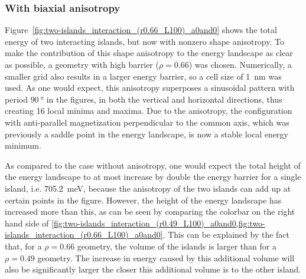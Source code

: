 \documentclass[11pt,a4paper,english]{article}
\begin{document}
\subsubsection{With biaxial anisotropy}
Figure~\ref{fig:two-islands_interaction_(r0.66_L100)_a0and0} shows the total energy of two interacting islands, but now with nonzero shape anisotropy. To make the contribution of this shape anisotropy to the energy landscape as clear as possible, a geometry with high barrier ($\rho=0.66$) was chosen. Numerically, a smaller grid also results in a larger energy barrier, so a cell size of \SI{1}{\nano\metre} was used. As one would expect, this anisotropy superposes a sinusoidal pattern with period $\SI{90}{\degree}$ in the figures, in both the vertical and horizontal directions, thus creating 16 local minima and maxima. Due to the anisotropy, the configuration with anti-parallel magnetization perpendicular to the common axis, which was previously a saddle point in the energy landscape, is now a stable local energy minimum. \par
As compared to the case without anisotropy, one would expect the total height of the energy landscape to at most increase by double the energy barrier for a single island, i.e. \SI{705.2}{\milli\electronvolt}, because the anisotropy of the two islands can add up at certain points in the figure. However, the height of the energy landscape has increased more than this, as can be seen by comparing the colorbar on the right hand side of \cref{fig:two-islands_interaction_(r0.49_L100)_a0and0,fig:two-islands_interaction_(r0.66_L100)_a0and0}. This can be explained by the fact that, for a $\rho=0.66$ geometry, the volume of the islands is larger than for a $\rho=0.49$ geometry. The increase in energy caused by this additional volume will also be significantly larger the closer this additional volume is to the other island. \par
\end{document}
